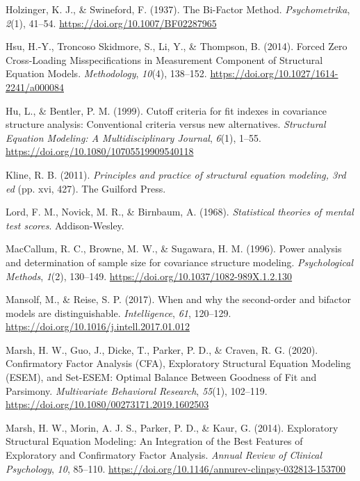 \documentclass[
  american,
  man,floatsintext]{apa7}
\newlength{\cslhangindent}
\newenvironment{CSLReferences}[2] %
 {\begin{list}{}{%
  \setlength{\itemindent}{0pt}
  \setlength{\leftmargin}{0pt}
  \setlength{\parsep}{0pt}
  \ifodd #1
   \setlength{\leftmargin}{\cslhangindent}
   \setlength{\itemindent}{-1\cslhangindent}
  \fi
  \setlength{\itemsep}{#2\baselineskip}}}
 {\end{list}}
\begin{document}
\begin{CSLReferences}{1}{0}
Holzinger, K. J., \& Swineford, F. (1937). The {Bi-Factor Method}. \emph{Psychometrika}, \emph{2}(1), 41--54. \url{https://doi.org/10.1007/BF02287965}

Hsu, H.-Y., Troncoso Skidmore, S., Li, Y., \& Thompson, B. (2014). Forced {Zero Cross-Loading Misspecifications} in {Measurement Component} of {Structural Equation Models}. \emph{Methodology}, \emph{10}(4), 138--152. \url{https://doi.org/10.1027/1614-2241/a000084}

Hu, L., \& Bentler, P. M. (1999). Cutoff criteria for fit indexes in covariance structure analysis: {Conventional} criteria versus new alternatives. \emph{Structural Equation Modeling: A Multidisciplinary Journal}, \emph{6}(1), 1--55. \url{https://doi.org/10.1080/10705519909540118}

Kline, R. B. (2011). \emph{Principles and practice of structural equation modeling, 3rd ed} (pp. xvi, 427). The Guilford Press.

Lord, F. M., Novick, M. R., \& Birnbaum, A. (1968). \emph{Statistical theories of mental test scores}. Addison-Wesley.

MacCallum, R. C., Browne, M. W., \& Sugawara, H. M. (1996). Power analysis and determination of sample size for covariance structure modeling. \emph{Psychological Methods}, \emph{1}(2), 130--149. \url{https://doi.org/10.1037/1082-989X.1.2.130}

Mansolf, M., \& Reise, S. P. (2017). When and why the second-order and bifactor models are distinguishable. \emph{Intelligence}, \emph{61}, 120--129. \url{https://doi.org/10.1016/j.intell.2017.01.012}

Marsh, H. W., Guo, J., Dicke, T., Parker, P. D., \& Craven, R. G. (2020). Confirmatory {Factor Analysis} ({CFA}), {Exploratory Structural Equation Modeling} ({ESEM}), and {Set-ESEM}: {Optimal Balance Between Goodness} of {Fit} and {Parsimony}. \emph{Multivariate Behavioral Research}, \emph{55}(1), 102--119. \url{https://doi.org/10.1080/00273171.2019.1602503}

Marsh, H. W., Morin, A. J. S., Parker, P. D., \& Kaur, G. (2014). Exploratory {Structural Equation Modeling}: {An Integration} of the {Best Features} of {Exploratory} and {Confirmatory Factor Analysis}. \emph{Annual Review of Clinical Psychology}, \emph{10}, 85--110. \url{https://doi.org/10.1146/annurev-clinpsy-032813-153700}


\end{CSLReferences}
\end{document}
